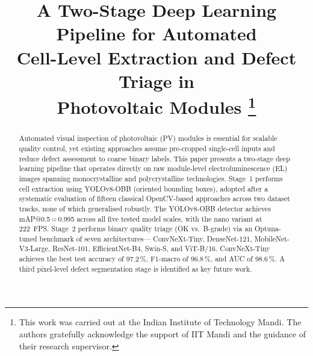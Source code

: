 \documentclass[conference]{IEEEtran}
\begin{document}
\title{A Two-Stage Deep Learning Pipeline for Automated\\
Cell-Level Extraction and Defect Triage in\\
Photovoltaic Modules%
\thanks{This work was carried out at the Indian Institute of
Technology Mandi. The authors gratefully acknowledge the
support of IIT Mandi and the guidance of their research
supervisor.}
}

\author{%
\and
{}
}

\maketitle

\begin{abstract}
Automated visual inspection of photovoltaic (PV) modules is
essential for scalable quality control, yet existing approaches
assume pre-cropped single-cell inputs and reduce defect
assessment to coarse binary labels.
This paper presents a two-stage deep learning pipeline that
operates directly on raw module-level electroluminescence (EL)
images spanning monocrystalline and polycrystalline technologies.
Stage~1 performs cell extraction using YOLOv8-OBB (oriented
bounding boxes), adopted after a systematic evaluation of
fifteen classical OpenCV-based approaches across two dataset
tracks, none of which generalised robustly.
The YOLOv8-OBB detector achieves mAP@0.5\,=\,0.995 across
all five tested model scales, with the nano variant at 222~FPS.
Stage~2 performs binary quality triage (OK vs.\ B-grade)
via an Optuna-tuned benchmark of seven architectures---
ConvNeXt-Tiny, DenseNet-121, MobileNet-V3-Large, ResNet-101,
EfficientNet-B4, Swin-S, and ViT-B/16.
ConvNeXt-Tiny achieves the best test accuracy of 97.2\,\%,
F1-macro of 96.8\,\%, and AUC of 98.6\,\%.
A third pixel-level defect segmentation stage is identified
as key future work.
\end{abstract}
\end{document}
